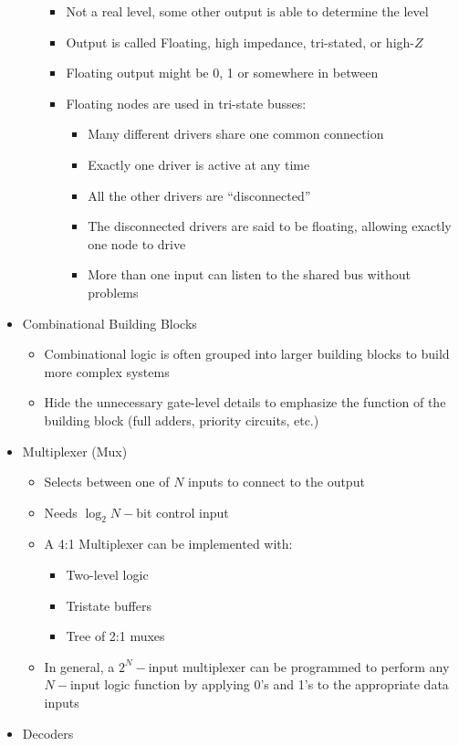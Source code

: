 \documentclass[a4paper]{article}
\begin{document}
\begin{itemize}
\begin{itemize}
\begin{itemize}
\item Not a real level, some other output is able to determine the level
\item Output is called Floating, high impedance, tri-stated, or high-$Z$
\item Floating output might be 0, 1 or somewhere in between
\item Floating nodes are used in tri-state busses:
\begin{itemize}
\item Many different drivers share one common connection
\item Exactly one driver is active at any time
\item All the other drivers are ``disconnected''
\item The disconnected drivers are said to be floating, allowing exactly one node to drive
\item More than one input can listen to the shared bus without problems
\end{itemize}
\end{itemize}
\end{itemize}
\item Combinational Building Blocks
\begin{itemize}
\item Combinational logic is often grouped into larger building blocks to build more complex systems
\item Hide the unnecessary gate-level details to emphasize the function of the building block (full adders, priority circuits, etc.)
\end{itemize}
\item Multiplexer (Mux)
\begin{itemize}
\item Selects between one of $N$ inputs to connect to the output
\item Needs $\log_2N-$bit control input
\item A 4:1 Multiplexer can be implemented with:
\begin{itemize}
\item Two-level logic
\item Tristate buffers
\item Tree of 2:1 muxes
\end{itemize}
\item In general, a $2^N-$input multiplexer can be programmed to perform any $N-$input logic function by applying 0's and 1's to the appropriate data inputs
\end{itemize}
\item Decoders

\end{itemize}
\end{document}
